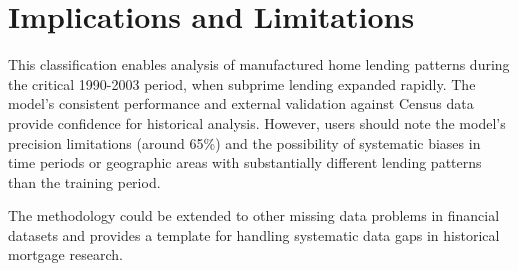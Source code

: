 \documentclass[11pt]{article}
\begin{document}
\section{Implications and Limitations}

This classification enables analysis of manufactured home lending patterns during the critical 1990-2003 period, when subprime lending expanded rapidly. The model's consistent performance and external validation against Census data provide confidence for historical analysis. However, users should note the model's precision limitations (around 65\%) and the possibility of systematic biases in time periods or geographic areas with substantially different lending patterns than the training period.

The methodology could be extended to other missing data problems in financial datasets and provides a template for handling systematic data gaps in historical mortgage research.
\end{document}
